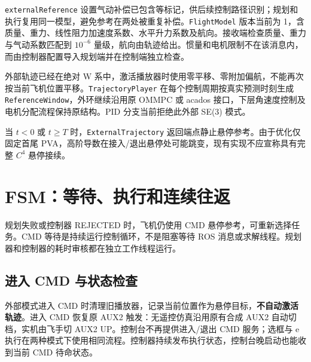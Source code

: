 \documentclass[UTF8,fontset=fandol,a4paper,10pt]{ctexart}
\newcommand{\code}[1]{{\small\nolinkurl{#1}}}
\begin{document}
\code{externalReference} 设置气动补偿已包含等标记，供后续控制路径识别；规划和执行复用同一模型，避免参考在两处被重复补偿。\code{FlightModel} 版本当前为 1，含质量、重力、线性阻力加速度系数、水平升力系数及航向。接收端检查质量、重力与气动系数匹配到 $10^{-6}$ 量级，航向由轨迹给出。惯量和电机限制不在该消息内，而由控制器配置导入规划端并在控制端独立检查。

外部轨迹已经在绝对 W 系中，激活播放器时使用零平移、零附加偏航，不能再次按当前飞机位置平移。\code{TrajectoryPlayer} 在每个控制周期按真实预测时刻生成 \code{ReferenceWindow}，外环继续沿用原 OMMPC 或 acados 接口，下层角速度控制及电机分配流程保持原结构。PID 分支当前拒绝此外部 SE(3) 模式。

当 $t<0$ 或 $t\ge T$ 时，\code{ExternalTrajectory} 返回端点静止悬停参考。由于优化仅固定首尾 PVA，高阶导数在接入/退出悬停处可能跳变，现有实现不应宣称具有完整 $C^4$ 悬停接续。

\section{FSM：等待、执行和连续往返}
\begin{center}
\end{center}
规划失败或控制器 REJECTED 时，飞机仍使用 CMD 悬停参考，可重新选择任务。CMD 等待是持续运行控制循环，不是阻塞等待 ROS 消息或求解线程。规划器和控制器的耗时审核都在独立工作线程运行。

\subsection{进入 CMD 与状态检查}
外部模式进入 CMD 时清理旧播放器，记录当前位置作为悬停目标，\textbf{不自动激活轨迹}。进入 CMD 恢复原 AUX2 触发：无遥控仿真沿用原有合成 AUX2 自动切档，实机由飞手切 AUX2 UP。控制台不再提供进入/退出 CMD 服务；选框与 e 执行在两种模式下使用相同流程。控制器持续发布执行状态，控制台晚启动也能收到当前 CMD 待命状态。
\end{document}
